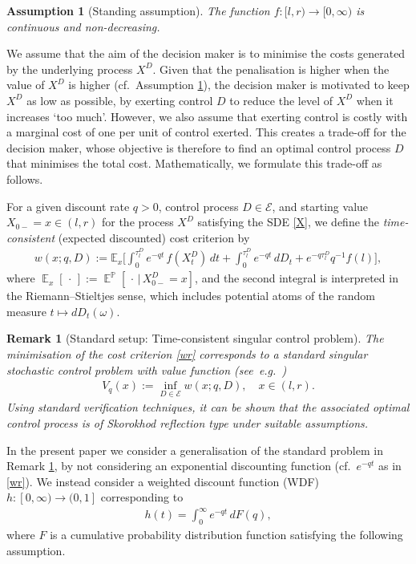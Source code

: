 \documentclass[11pt]{article} %
\newtheorem{assumption}[theorem]{Assumption}
\newtheorem{remark}[theorem]{Remark}
\def\Pr{\mathbb{P}}
\DeclareMathOperator{\E}{\mathbb E}
\numberwithin{komcounter}{section}
\begin{document}
\begin{assumption}[Standing assumption] \label{Ass:f} 
The function $f:[l,r)\rightarrow [0,\infty)$ is continuous and non-decreasing.
\end{assumption}

We assume that the aim of the decision maker is to minimise the costs generated by the  underlying process $X^{D}$. 
Given that the penalisation is higher when the value of $X^D$ is higher (cf.\ Assumption \ref{Ass:f}), the decision maker is motivated to keep $X^D$ as low as possible, by exerting control $D$ to reduce the level of $X^D$ when it increases `too much'.
However, we also assume that exerting control is  costly with a marginal cost of one per unit of control exerted. This creates a trade-off for the decision maker, whose objective is therefore to find an optimal control process $D$ that minimises the total cost.  
Mathematically, we formulate this trade-off as follows.

For a given discount rate $q>0$, control process $D \in \mathcal{E}$, and starting value 
$X_{0-}=x\in(l,r)$ for the process $X^{D}$ satisfying the SDE \eqref{X}, we define the {\it time-consistent} (expected discounted) cost criterion by
\begin{align} \label{wr} 
w(x;q,D):= \mathbb{E}_x\bigg[ \int_0^{\tau^D_l} e^{-q t} \, f(X^D_t) \, dt + \int_0^{\tau^D_l} e^{-q t} \, dD_t + e^{-q \tau^D_l} q^{-1}f(l) \bigg] ,
\end{align}
where $\E_x[\,\cdot\,] := \E^\Pr[\,\cdot \, | \, X^D_{0-}=x]$, 
and the second integral is interpreted in the Riemann–Stieltjes sense, which includes potential atoms of the random measure $t\mapsto dD_t(\omega)$. 

\begin{remark}[Standard setup: Time-consistent singular control problem] \label{rem:stdprob}
The minimisation of the cost criterion \eqref{wr} corresponds to a standard singular stochastic control problem with value function (see~e.g.~\cite[Chapter VIII]{Fleming-Soner})
\begin{align} \label{Ax}
V_q(x) := \inf_{D \in \mathcal{E}} w(x;q,D), \quad x \in (l,r). 
\end{align}
Using standard verification techniques, it can be shown that the associated optimal control process is of Skorokhod reflection type under suitable assumptions. 
\end{remark}

In the present paper we consider a generalisation of the standard problem in Remark \ref{rem:stdprob}, 
by not considering an exponential discounting function (cf.\ $e^{-qt}$ as in \eqref{wr}). 
We instead consider a weighted discount function (WDF) $h:[0,\infty)\rightarrow (0,1]$ corresponding to
\begin{align}\label{eq:h-function}
h(t)=\int_0^\infty e^{-qt} \, dF(q),
\end{align} 
where $F$ is a cumulative probability distribution function satisfying the following assumption. 
\end{document}
